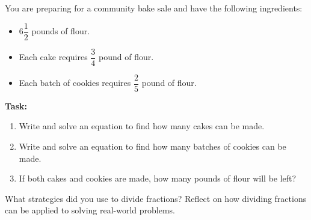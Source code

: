 \documentclass[12pt]{article}
\begin{document}
\vspace{1em}

\begin{tcolorbox}[colframe=black!60, colback=white, 
coltitle=black, colbacktitle=black!15, fonttitle=\bfseries\Large, 
title=Performance Task: Sharing Ingredients, halign title=center, left=10pt, right=10pt, top=10pt, bottom=90pt]
You are preparing for a community bake sale and have the following ingredients:
\begin{itemize}
    \item \( 6 \dfrac{1}{2} \) pounds of flour.
    \item Each cake requires \( \dfrac{3}{4} \) pound of flour.
    \item Each batch of cookies requires \( \dfrac{2}{5} \) pound of flour.
\end{itemize}
\textbf{Task:}
\begin{enumerate}[itemsep=4em]
    \item Write and solve an equation to find how many cakes can be made.
    \item Write and solve an equation to find how many batches of cookies can be made.
    \item If both cakes and cookies are made, how many pounds of flour will be left?
\end{enumerate}
\end{tcolorbox}

\vspace{1em}

\begin{tcolorbox}[colframe=black!60, colback=white, 
coltitle=black, colbacktitle=black!15, fonttitle=\bfseries\Large, 
title=Reflection, halign title=center, left=10pt, right=10pt, top=10pt, bottom=100pt]
What strategies did you use to divide fractions? Reflect on how dividing fractions can be applied to solving real-world problems.
\end{tcolorbox}
\end{document}
